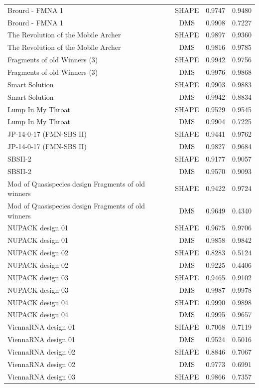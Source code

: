 \documentclass[letter]{bioinfo}
\begin{document}
\begin{center}
\begin{longtable}{lccc}
Brourd - FMNA 1	&	SHAPE	&	0.9747 	&	0.9480 	\\
Brourd - FMNA 1	&	DMS	&	0.9908 	&	0.7227 	\\
The Revolution of the Mobile Archer	&	SHAPE	&	0.9897 	&	0.9360 	\\
The Revolution of the Mobile Archer	&	DMS	&	0.9816 	&	0.9785 	\\
Fragments of old Winners (3)	&	SHAPE	&	0.9942 	&	0.9756 	\\
Fragments of old Winners (3)	&	DMS	&	0.9976 	&	0.9868 	\\
Smart Solution	&	SHAPE	&	0.9903 	&	0.9883 	\\
Smart Solution	&	DMS	&	0.9942 	&	0.8834 	\\
Lump In My Throat	&	SHAPE	&	0.9529 	&	0.9545 	\\
Lump In My Throat	&	DMS	&	0.9904 	&	0.7225 	\\
JP-14-0-17 (FMN-SBS II)	&	SHAPE	&	0.9441 	&	0.9762 	\\
JP-14-0-17 (FMN-SBS II)	&	DMS	&	0.9827 	&	0.9684 	\\
SBSII-2	&	SHAPE	&	0.9177 	&	0.9057 	\\
SBSII-2	&	DMS	&	0.9570 	&	0.9093 	\\
Mod of Quasispecies design Fragments of old winners	&	SHAPE	&	0.9422 	&	 0.9724 	\\
Mod of Quasispecies design Fragments of old winners	&	DMS	&	0.9649 	&	 0.4340 	\\
NUPACK design 01	&	SHAPE	&	0.9675 	&	0.9706 	\\
NUPACK design 01	&	DMS	&	0.9858 	&	0.9842 	\\
NUPACK design 02	&	SHAPE	&	0.8283 	&	0.5124 	\\
NUPACK design 02	&	DMS	&	0.9225 	&	0.4406 	\\
NUPACK design 03	&	SHAPE	&	0.9465 	&	0.9102 	\\
NUPACK design 03	&	DMS	&	0.9987 	&	0.9978 	\\
NUPACK design 04	&	SHAPE	&	0.9990 	&	0.9898 	\\
NUPACK design 04	&	DMS	&	0.9995 	&	0.9657 	\\
ViennaRNA design 01	&	SHAPE	&	0.7068 	&	0.7119 	\\
ViennaRNA design 01	&	DMS	&	0.9524 	&	0.5016 	\\
ViennaRNA design 02	&	SHAPE	&	0.8846 	&	0.7067 	\\
ViennaRNA design 02	&	DMS	&	0.9773 	&	0.6991 	\\
ViennaRNA design 03	&	SHAPE	&	0.9866 	&	0.7357 	\\

\end{longtable}
\end{center}
\end{document}
